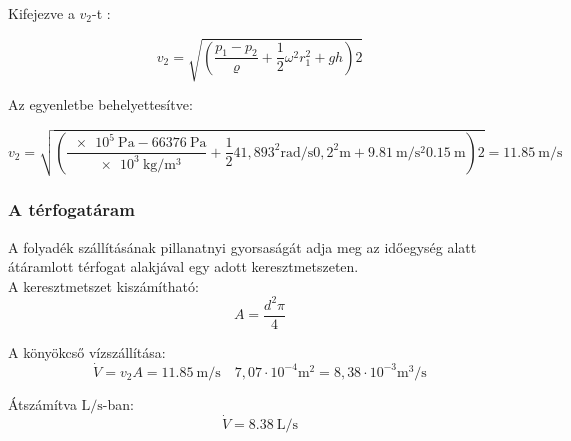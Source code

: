 \noindent Kifejezve a $v_{2}$-t : 

\begin{equation}
	v_{2} = \sqrt{\left( \dfrac{p_{1}-p_{2}}{\varrho} + \dfrac{1}{2} \omega ^{2} r_{1}^{2} + g h \right) 2 }
\end{equation}

\noindent Az egyenletbe behelyettesítve:

\begin{equation}
	v_{2} = \sqrt{\left( \dfrac{\SI{e5}{\pascal}-\SI{66 376}{\pascal}}{\SI{e3}{\kilogram\per\meter\cubed}}
	+ 
	\dfrac{1}{2} {41,893}^{2} \si{\radian\per\second} {0,2}^{2} \si{\meter}
	+ 
	\SI{9,81}{\meter\per\second\squared} \SI{0,15}{\meter} \right) 2 }
	= 
	\SI{11,85}{\meter\per\second}
\end{equation}

\subsubsection{A térfogatáram}
\noindent A folyadék szállításának pillanatnyi gyorsaságát adja meg az időegység alatt átáramlott térfogat alakjával egy adott keresztmetszeten.\\
\noindent A keresztmetszet kiszámítható:
\begin{equation}
	A = \dfrac{d^{2} \pi}{4}
\end{equation}

\noindent A könyökcső vízszállítása:
\begin{equation}
	\dot{V} = v_{2} A =  \SI{11,85}{\meter\per\second} \quad 7,07 \cdot 10^{-4} \si{\meter\squared}
	= 
	8,38 \cdot 10^{-3} \si{\meter\cubed\per\second}
\end{equation}

\noindent Átszámítva $\si{\liter\per\second}$-ban:
\begin{equation}
	\dot{V} = \SI{8,38}{\liter\per\second}
\end{equation}
